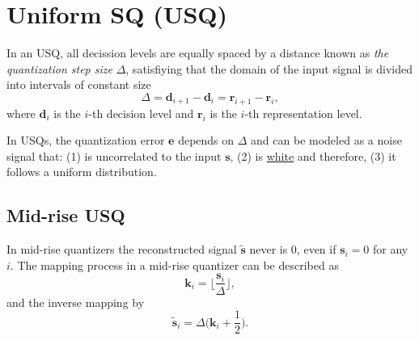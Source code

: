 
\section{Uniform SQ (USQ)}

In an USQ, all decission levels are equally spaced by a distance known
as \emph{the quantization step size} $\Delta$, satisfiying that the
domain of the input signal is divided into intervals of constant size
\begin{equation}
  \Delta={\mathbf d}_{i+1}-{\mathbf d}_i={\mathbf r}_{i+1}-{\mathbf r}_i,
\end{equation}
where ${\mathbf d}_i$ is the $i$-th decision level and ${\mathbf r}_i$
is the $i$-th representation level.

In USQs, the quantization error ${\mathbf e}$ depends on $\Delta$ and
can be modeled as a noise signal that: (1) is uncorrelated to the
input ${\mathbf s}$, (2) is
\href{https://en.wikipedia.org/wiki/White_noise}{white} and therefore,
(3) it follows a uniform distribution.




\subsection{Mid-rise USQ}

In mid-rise quantizers the reconstructed signal $\tilde{\mathbf s}$
never is 0, even if ${\mathbf s}_i=0$ for any $i$. The mapping process
in a mid-rise quantizer can be described as
\begin{equation}
  {\mathbf k}_i = \Big\lfloor \frac{{\mathbf s}_i}{\Delta} \Big\rfloor,
  \label{eq:mid-rise}
\end{equation}
and the inverse mapping by
\begin{equation}
  \tilde{\mathbf s}_i = \Delta\Big({\mathbf k}_i + \frac{1}{2}\Big).
  \label{eq:inverse_mid-rise}
\end{equation}

